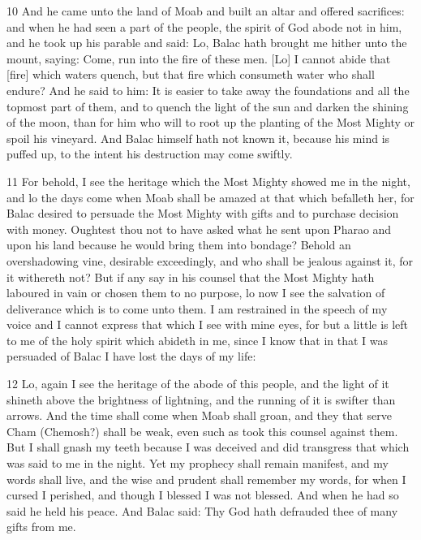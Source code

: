 \par 10 And he came unto the land of Moab and built an altar and offered sacrifices: and when he had seen a part of the people, the spirit of God abode not in him, and he took up his parable and said: Lo, Balac hath brought me hither unto the mount, saying: Come, run into the fire of these men. [Lo] I cannot abide that [fire] which waters quench, but that fire which consumeth water who shall endure? And he said to him: It is easier to take away the foundations and all the topmost part of them, and to quench the light of the sun and darken the shining of the moon, than for him who will to root up the planting of the Most Mighty or spoil his vineyard. And Balac himself hath not known it, because his mind is puffed up, to the intent his destruction may come swiftly. 

\par 11 For behold, I see the heritage which the Most Mighty showed me in the night, and lo the days come when Moab shall be amazed at that which befalleth her, for Balac desired to persuade the Most Mighty with gifts and to purchase decision with money. Oughtest thou not to have asked what he sent upon Pharao and upon his land because he would bring them into bondage? Behold an overshadowing vine, desirable exceedingly, and who shall be jealous against it, for it withereth not? But if any say in his counsel that the Most Mighty hath laboured in vain or chosen them to no purpose, lo now I see the salvation of deliverance which is to come unto them. I am restrained in the speech of my voice and I cannot express that which I see with mine eyes, for but a little is left to me of the holy spirit which abideth in me, since I know that in that I was persuaded of Balac I have lost the days of my life: 

\par 12 Lo, again I see the heritage of the abode of this people, and the light of it shineth above the brightness of lightning, and the running of it is swifter than arrows. And the time shall come when Moab shall groan, and they that serve Cham (Chemosh?) shall be weak, even such as took this counsel against them. But I shall gnash my teeth because I was deceived and did transgress that which was said to me in the night. Yet my prophecy shall remain manifest, and my words shall live, and the wise and prudent shall remember my words, for when I cursed I perished, and though I blessed I was not blessed. And when he had so said he held his peace. And Balac said: Thy God hath defrauded thee of many gifts from me.

